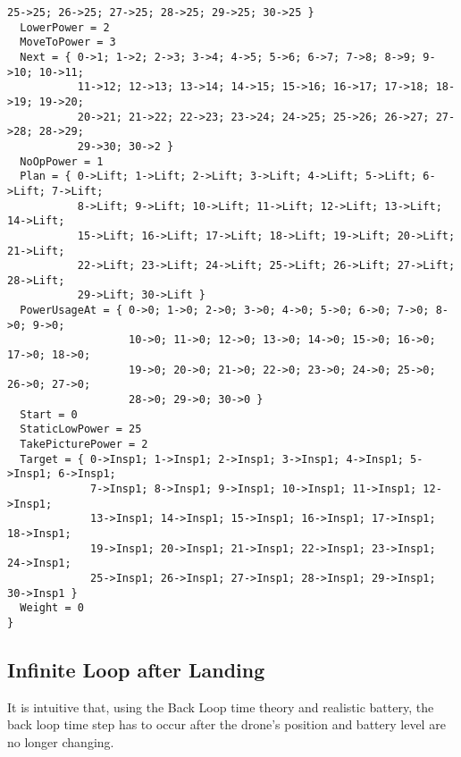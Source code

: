 \documentclass[12pt]{extarticle}
\begin{document}
\begin{lstlisting}[basicstyle=\tiny]
               25->25; 26->25; 27->25; 28->25; 29->25; 30->25 }
  LowerPower = 2
  MoveToPower = 3
  Next = { 0->1; 1->2; 2->3; 3->4; 4->5; 5->6; 6->7; 7->8; 8->9; 9->10; 10->11;
           11->12; 12->13; 13->14; 14->15; 15->16; 16->17; 17->18; 18->19; 19->20;
           20->21; 21->22; 22->23; 23->24; 24->25; 25->26; 26->27; 27->28; 28->29;
           29->30; 30->2 }
  NoOpPower = 1
  Plan = { 0->Lift; 1->Lift; 2->Lift; 3->Lift; 4->Lift; 5->Lift; 6->Lift; 7->Lift;
           8->Lift; 9->Lift; 10->Lift; 11->Lift; 12->Lift; 13->Lift; 14->Lift;
           15->Lift; 16->Lift; 17->Lift; 18->Lift; 19->Lift; 20->Lift; 21->Lift;
           22->Lift; 23->Lift; 24->Lift; 25->Lift; 26->Lift; 27->Lift; 28->Lift;
           29->Lift; 30->Lift }
  PowerUsageAt = { 0->0; 1->0; 2->0; 3->0; 4->0; 5->0; 6->0; 7->0; 8->0; 9->0;
                   10->0; 11->0; 12->0; 13->0; 14->0; 15->0; 16->0; 17->0; 18->0;
                   19->0; 20->0; 21->0; 22->0; 23->0; 24->0; 25->0; 26->0; 27->0;
                   28->0; 29->0; 30->0 }
  Start = 0
  StaticLowPower = 25
  TakePicturePower = 2
  Target = { 0->Insp1; 1->Insp1; 2->Insp1; 3->Insp1; 4->Insp1; 5->Insp1; 6->Insp1;
             7->Insp1; 8->Insp1; 9->Insp1; 10->Insp1; 11->Insp1; 12->Insp1;
             13->Insp1; 14->Insp1; 15->Insp1; 16->Insp1; 17->Insp1; 18->Insp1;
             19->Insp1; 20->Insp1; 21->Insp1; 22->Insp1; 23->Insp1; 24->Insp1;
             25->Insp1; 26->Insp1; 27->Insp1; 28->Insp1; 29->Insp1; 30->Insp1 }
  Weight = 0
}
\end{lstlisting}

\subsection{Infinite Loop after Landing}
\label{app:strucinfinitelanded}
It is intuitive that, using the Back Loop time theory and realistic battery, the back loop time step has to occur after the drone's position and battery level are no longer changing. 
\end{document}

